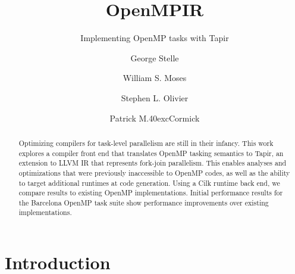 \documentclass[sigconf]{acmart}
\newcommand{\McCormick} {M\raise .40ex\hbox{c}Cormick}
\begin{document}

\title{OpenMPIR}
\subtitle{Implementing OpenMP tasks with Tapir}

\author{George Stelle}

\author{William S. Moses}

\author{Stephen L. Olivier}

\author{Patrick \McCormick}

\renewcommand{\shortauthors}{G. Stelle et al.}

\begin{abstract}
Optimizing compilers for task-level parallelism are still in their infancy.
This work explores a compiler front end that translates OpenMP tasking
semantics to Tapir, an extension to LLVM IR that represents fork-join
parallelism. This enables analyses and optimizations that were previously
inaccessible to OpenMP codes, as well as the ability to target additional
runtimes at code generation. Using a Cilk runtime back end, we compare results
to existing OpenMP implementations.  Initial performance results for the
Barcelona OpenMP task suite show performance improvements over existing
implementations.
\end{abstract}

\maketitle

\section{Introduction} \label{Sec:Introduction}
\end{document}
